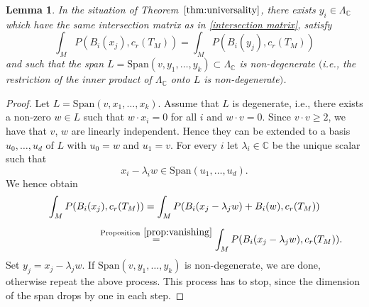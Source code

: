 \documentclass[pdftex]{sigma}
\numberwithin{equation}{section}
\newtheorem{Lemma}[Theorem]{Lemma}
\newcommand{\BC}{{\mathbb{C}}}
\newcommand{\1}{\mathsf{1}}
\begin{document}
\begin{Lemma} \label{lemma:replace with non-degenerate}
In the situation of Theorem~$\ref{thm:universality}$, there exists $y_i \in \Lambda_{\BC}$ which have the same intersection matrix as in \eqref{intersection matrix},
satisfy
\[ \int_{M} P( B_i(x_j), c_r(T_M) ) = \int_{M} P( B_i(y_j), c_r(T_M) ) \]
and such that the span $L = \mathrm{Span}( v, y_1, \dots, y_k ) \subset \Lambda_{\BC}$ is non-degenerate $($i.e., the restriction of the inner product of $\Lambda_{\BC}$ onto $L$ is non-degenerate$)$.
\end{Lemma}

\begin{proof}
Let $L = \mathrm{Span}(v, x_1, \dots, x_k)$.
Assume that $L$ is degenerate, i.e., there exists a non-zero $w \in L$ such that $w \cdot x_i = 0$ for all $i$ and $w \cdot v=0$.
Since $v \cdot v \geq 2$, we have that $v$, $w$ are linearly independent. Hence they can be extended to a basis $u_0, \dots, u_d$ of $L$ with $u_0 = w$ and $u_1=v$.
For every $i$ let $\lambda_i \in \BC$ be the unique scalar such that
\[
x_i - \lambda_i w \in \mathrm{Span}( u_1, \dots, u_d ).
\]
We hence obtain
\begin{gather*}
\int_{M} P( B_i(x_j), c_r(T_M) ) =
\int_{M} P( B_i(x_j - \lambda_j w) + B_i(w), c_r(T_M) )
\\[1ex] \qquad\qquad\qquad\quad\,
{} \overset{\rm Proposition~\ref{prop:vanishing}}{=}
\int_{M} P( B_i(x_j - \lambda_j w), c_r(T_M) ).
\end{gather*}
Set $y_j = x_j - \lambda_j w$. If $\mathrm{Span}(v, y_1, \dots, y_k)$ is non-degenerate, we are done,
otherwise repeat the above process. This process has to stop, since the dimension of the span drops by one in each step.
\end{proof}
\end{document}
